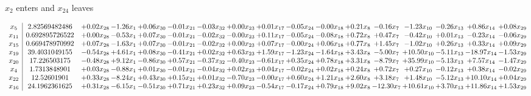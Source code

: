 \documentclass[9pt]{article}
\begin{document}
 $ x_{2} $ enters and $ x_{24} $ leaves 

 \[\begin{array}{c| c c@{\hskip 2pt} c@{\hskip 2pt} c@{\hskip 2pt} c@{\hskip 2pt} c@{\hskip 2pt} c@{\hskip 2pt} c@{\hskip 2pt} c@{\hskip 2pt} c@{\hskip 2pt} c@{\hskip 2pt} c@{\hskip 2pt} c@{\hskip 2pt} c@{\hskip 2pt} c@{\hskip 2pt} c@{\hskip 2pt} }
 x_{5}   &  2.82569482486 & +  0.02 x_{28} & -1.26 x_{1} & +  0.06 x_{30} & -0.01 x_{21} & -0.03 x_{32} & +  0.00 x_{23} & +  0.01 x_{17} & -0.05 x_{24} & -0.00 x_{18} & +  0.21 x_{8} & -0.16 x_{7} & -1.23 x_{10} & -0.26 x_{13} & +  0.86 x_{14} & +  0.08 x_{29}\\
 x_{11}   &  0.692895726522 & +  0.00 x_{28} & -0.53 x_{1} & +  0.07 x_{30} & -0.01 x_{21} & -0.02 x_{32} & -0.00 x_{23} & +  0.11 x_{17} & -0.05 x_{24} & -0.08 x_{18} & +  0.72 x_{8} & +  0.47 x_{7} & -0.42 x_{10} & +  0.01 x_{13} & -0.23 x_{14} & -0.06 x_{29}\\
 x_{15}   &  0.669478970992 & +  0.07 x_{28} & -1.63 x_{1} & +  0.07 x_{30} & -0.01 x_{21} & -0.02 x_{32} & +  0.00 x_{23} & +  0.07 x_{17} & -0.00 x_{24} & +  0.06 x_{18} & +  0.77 x_{8} & +  1.45 x_{7} & -1.02 x_{10} & +  0.26 x_{13} & +  0.33 x_{14} & +  0.09 x_{29}\\
 x_{19}   &  39.4031049155 & -0.54 x_{28} & +  4.61 x_{1} & +  0.08 x_{30} & -0.41 x_{21} & +  0.02 x_{32} & +  0.63 x_{23} & +  1.59 x_{17} & -1.23 x_{24} & -1.64 x_{18} & +  3.43 x_{8} & -5.00 x_{7} & + 10.50 x_{10} & -5.11 x_{13} & -18.97 x_{14} & -1.53 x_{29}\\
 x_{20}   &  17.226503175 & -0.48 x_{28} & +  9.12 x_{1} & -0.86 x_{30} & +  0.57 x_{21} & -0.37 x_{32} & -0.40 x_{23} & -0.61 x_{17} & +  0.35 x_{24} & +  0.78 x_{18} & +  3.31 x_{8} & -8.79 x_{7} & + 35.99 x_{10} & -5.13 x_{13} & +  7.57 x_{14} & -1.47 x_{29}\\
 x_{4}   &  1.7313848901 & +  0.03 x_{28} & -0.88 x_{1} & +  0.01 x_{30} & -0.01 x_{21} & -0.04 x_{32} & +  0.02 x_{23} & +  0.04 x_{17} & -0.02 x_{24} & +  0.02 x_{18} & +  0.24 x_{8} & +  0.72 x_{7} & +  0.27 x_{10} & -0.12 x_{13} & +  0.38 x_{14} & -0.02 x_{29}\\
 x_{22}   &  12.52601901 & +  0.33 x_{28} & -8.24 x_{1} & +  0.43 x_{30} & +  0.15 x_{21} & +  0.01 x_{32} & -0.70 x_{23} & -0.00 x_{17} & +  0.60 x_{24} & +  1.21 x_{18} & +  2.60 x_{8} & +  3.18 x_{7} & +  1.48 x_{10} & -5.12 x_{13} & + 10.10 x_{14} & +  0.04 x_{29}\\
 x_{16}   &  24.1962361625 & +  0.31 x_{28} & -6.15 x_{1} & -0.51 x_{30} & +  0.71 x_{21} & +  0.23 x_{32} & +  0.09 x_{23} & -0.54 x_{17} & -0.17 x_{24} & +  0.79 x_{18} & +  9.02 x_{8} & -12.30 x_{7} & + 10.61 x_{10} & +  3.70 x_{13} & + 11.86 x_{14} & +  1.53 x_{29}\\

\end{array}\]
\end{document}
